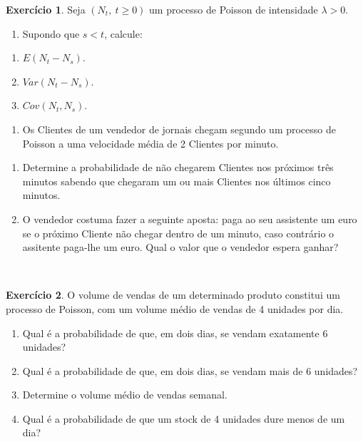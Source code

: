\documentclass[
  11pt,
  a4paper,
]{book}
\providecommand{\tightlist}{%
  \setlength{\itemsep}{0pt}\setlength{\parskip}{0pt}}
\theoremstyle{definition}
\theoremstyle{definition}
\theoremstyle{definition}
\newtheorem{exercise}{Exercício}[chapter]
\theoremstyle{definition}
\theoremstyle{remark}
\begin{document}
\begin{exercise}
\leavevmode

Seja \((N_t, ~ t \geq 0)\) um processo de Poisson de intensidade \(\lambda >0\).

\begin{enumerate}
\def\labelenumi{(\alph{enumi})}
\tightlist
\item
  Supondo que \(s<t\), calcule:
\end{enumerate}

\begin{enumerate}
\def\labelenumi{\roman{enumi}.}
\item
  \(E(N_t-N_s)\).
\item
  \(Var(N_t-N_s)\).
\item
  \(Cov(N_t,N_s)\).
\end{enumerate}

\begin{enumerate}
\def\labelenumi{(\alph{enumi})}
\setcounter{enumi}{1}
\tightlist
\item
  Os Clientes de um vendedor de jornais chegam segundo um processo de Poisson a uma velocidade média de 2 Clientes por minuto.
\end{enumerate}

\begin{enumerate}
\def\labelenumi{\roman{enumi}.}
\item
  Determine a probabilidade de não chegarem Clientes nos próximos três minutos sabendo que chegaram um ou mais Clientes nos últimos cinco minutos.
\item
  O vendedor costuma fazer a seguinte aposta: paga ao seu assistente um euro se o próximo Cliente não chegar dentro de um minuto, caso contrário o assitente paga-lhe um euro. Qual o valor que o vendedor espera ganhar?
\end{enumerate}

\end{exercise}

\(\,\)

\begin{exercise}
\leavevmode

O volume de vendas de um determinado produto constitui um processo de Poisson, com um volume médio de vendas de 4 unidades por dia.

\begin{enumerate}
\def\labelenumi{(\alph{enumi})}
\item
  Qual é a probabilidade de que, em dois dias, se vendam exatamente 6 unidades?
\item
  Qual é a probabilidade de que, em dois dias, se vendam mais de 6 unidades?
\item
  Determine o volume médio de vendas semanal.
\item
  Qual é a probabilidade de que um stock de 4 unidades dure menos de um dia?
\end{enumerate}

\end{exercise}
\end{document}
